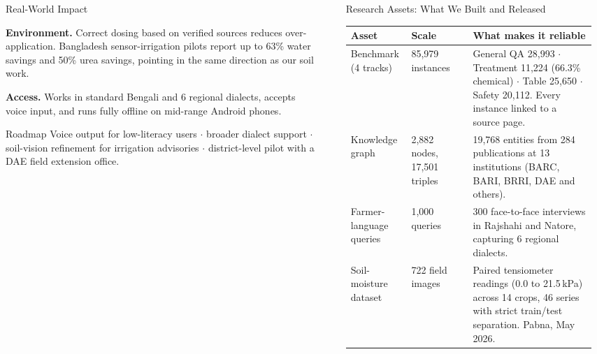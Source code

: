\documentclass[final]{beamer}
\newlength{\sepwidth}\setlength{\sepwidth}{0.017\paperwidth}
\newlength{\colwidth}\setlength{\colwidth}{0.1796\paperwidth}
\newcommand{\separatorcolumn}{\begin{column}{\sepwidth}\end{column}}
\newcommand{\Nbench}{85{,}979}
\newcommand{\Nnodes}{2{,}882}
\newcommand{\Npubs}{284}
\newcommand{\Ninst}{13}
\newcommand{\Ntriples}{17{,}501}
\newcommand{\Nentities}{19{,}768}
\newcommand{\Nfarmerq}{1{,}000}
\newcommand{\Ninterviews}{300}
\newcommand{\Ndialects}{6}
\newcommand{\Nsoil}{722}
\newcommand{\Nseries}{46}
\newcommand{\Ncrops}{14}
\newcommand{\WaterSave}{63\%}
\newcommand{\UreaSave}{50\%}
\begin{document}
\begin{frame}[t]
\begin{columns}[t]
\begin{column}{\colwidth}
\begin{block}{Real-World Impact}
{    \textbf{Environment.} Correct dosing based on verified sources reduces
    over-application. Bangladesh sensor-irrigation pilots report up to \WaterSave{} water
    savings and \UreaSave{} urea savings, pointing in the same direction as our soil work.

    \textbf{Access.} Works in standard Bengali and \Ndialects{} regional dialects,
    accepts voice input, and runs fully offline on mid-range Android phones.}
  \end{block}

  \begin{exampleblock}{Roadmap}
    {\small Voice output for low-literacy users $\cdot$ broader dialect support $\cdot$
    soil-vision refinement for irrigation advisories $\cdot$
    district-level pilot with a DAE field extension office.}
  \end{exampleblock}

\end{column}

\separatorcolumn

\begin{column}{\colwidth}

  \begin{block}{Research Assets: What We Built and Released}
    {\small
    \begin{tabular}{@{}p{0.22\linewidth}p{0.24\linewidth}p{0.48\linewidth}@{}}
      \toprule
      \textbf{Asset} & \textbf{Scale} & \textbf{What makes it reliable} \\ \midrule
      Benchmark (4 tracks) & \Nbench{} instances &
        General QA 28,993 $\cdot$ Treatment 11,224 (66.3\% chemical) $\cdot$
        Table 25,650 $\cdot$ Safety 20,112. Every instance linked to a source page. \\[0.5ex]
      Knowledge graph & \Nnodes{} nodes, \Ntriples{} triples &
        \Nentities{} entities from \Npubs{} publications at \Ninst{} institutions
        (BARC, BARI, BRRI, DAE and others). \\[0.5ex]
      Farmer-language queries & \Nfarmerq{} queries &
        \Ninterviews{} face-to-face interviews in Rajshahi and Natore,
        capturing \Ndialects{} regional dialects. \\[0.5ex]
      Soil-moisture dataset & \Nsoil{} field images &
        Paired tensiometer readings (0.0 to 21.5\,kPa) across \Ncrops{} crops,
        \Nseries{} series with strict train/test separation. Pabna, May 2026. \\
      \bottomrule
    \end{tabular}

}
\end{block}
\end{column}
\end{columns}
\end{frame}
\end{document}
